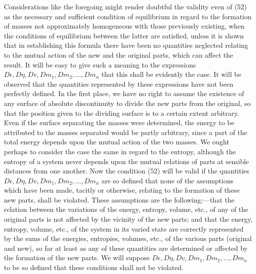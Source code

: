 \documentclass[11pt]{article}
\begin{document}
Considerations like the foregoing might render doubtful the validity even of (52) as the necessary and sufficient condition of equilibrium in regard to the formation of masses not approximately homogeneous with those previously existing, when the conditions of equilibrium between the latter are satisfied, unless it is shown that in establishing this formula there have been no quantities neglected relating to the mutual action of the new and the original parts, which can affect the result. It will be easy to give such a meaning to the expressions \(D\epsilon,D\eta,Dv,Dm_1,Dm_2,\ldots,Dm_n\) that this shall be evidently the case. It will be observed that the quantities represented by these expressions have not been perfectly defined. In the first place, we have no right to assume the existence of any surface of absolute discontinuity to divide the new parts from the original, so that the position given to the dividing surface is to a certain extent arbitrary. Even if the surface separating the masses were determined, the energy to be attributed to the masses separated would be partly arbitrary, since a part of the total energy depends upon the mutual action of the two masses. We ought perhaps to consider the case the same in regard to the entropy, although the entropy of a system never depends upon the mutual relations of parts at sensible distances from one another. Now the condition (52) will be valid if the quantities \(D\epsilon,D\eta,Dv,Dm_1,Dm_2,\ldots,Dm_n\) are so defined that none of the assumptions which have been made, tacitly or otherwise, relating to the formation of these new parts, shall be violated. These assumptions are the following:---that the relation between the variations of the energy, entropy, volume, etc., of any of the original parts is not affected by the vicinity of the new parts; and that the energy, entropy, volume, etc., of the system in its varied state are correctly represented by the sums of the energies, entropies, volumes, etc., of the various parts (original and new), so far at least as any of these quantities are determined or affected by the formation of the new parts. We will suppose \(D\epsilon,D\eta,Dv,Dm_1,Dm_2,\ldots,Dm_n\) to be so defined that these conditions shall not be violated.
\end{document}
